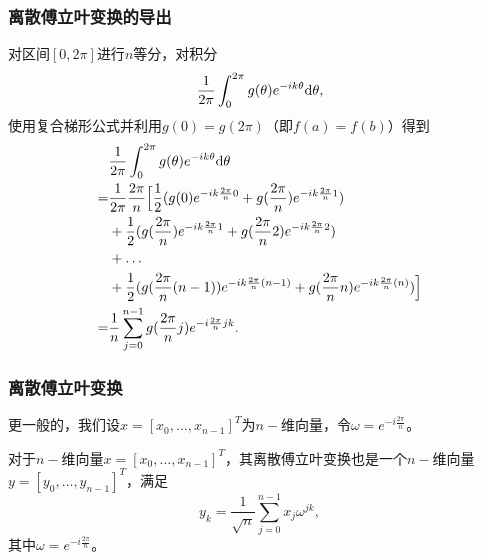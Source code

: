 \documentclass[10pt]{beamer}
\def\dd{{\rm d}}
\begin{document}
\begin{frame}
\frametitle{离散傅立叶变换的导出}
对区间$[0, 2\pi]$进行$n$等分，对积分
\begin{equation}
\frac{1}{2\pi} \int_0^{2\pi} g(\theta) e^{-i k \theta} \dd \theta,
\end{equation}
使用复合梯形公式并利用$g(0) = g(2\pi)$（即$f(a) = f(b)$）得到
\begin{align}
&\frac{1}{2\pi} \int_0^{2\pi} g(\theta) e^{-i k \theta} \dd \theta \nonumber\\
= &\frac{1}{2\pi} \frac{2\pi}{n} \Big[ \frac{1}{2}(g(0)e^{-i k \frac{2\pi}{n}0} + g(\frac{2\pi}{n})e^{-i k \frac{2\pi}{n}1}) \nonumber \\
& +  \frac{1}{2}(g(\frac{2\pi}{n})e^{-i k \frac{2\pi}{n}1} + g(\frac{2\pi}{n}2)e^{-i k \frac{2\pi}{n}2}) \nonumber \\
& + \ldots \nonumber \\
&+ \frac{1}{2}(g(\frac{2\pi}{n}(n-1))e^{-i k \frac{2\pi}{n}(n-1)} + g(\frac{2\pi}{n}n)e^{-i k \frac{2\pi}{n}(n)}) \Big] \nonumber \\
=& \frac{1}{n} \sum_{j = 0}^{n-1} g(\frac{2\pi}{n}j) e^{-i  \frac{2\pi}{n}jk}.
\end{align}
\end{frame}


\begin{frame}
\frametitle{离散傅立叶变换}
更一般的，我们设$x = [x_0, \ldots, x_{n-1}]^T$为$n-$维向量，令$\omega = e^{-i \frac{2\pi}{n}}$。
\begin{definition}[离散傅立叶变换]
对于$n-$维向量$x = [x_0, \ldots, x_{n-1}]^T$，其离散傅立叶变换也是一个$n-$维向量$y = [y_0, \ldots, y_{n-1}]^T$，满足
\begin{equation}
\label{eq: DFT original}
y_k = \frac{1}{\sqrt{n}} \sum_{j = 0}^{n-1} x_j \omega^{jk},
\end{equation}
其中$\omega = e^{-i \frac{2\pi}{n}}$。
\end{definition}
\end{frame}
\end{document}
